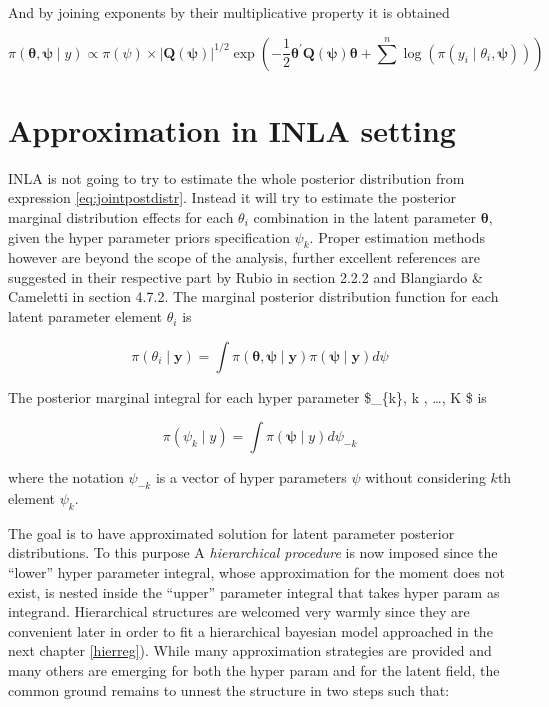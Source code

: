 \documentclass[
  12pt,
  a4paper,
  oneside]{book}
\theoremstyle{definition}
\theoremstyle{definition}
\theoremstyle{definition}
\theoremstyle{remark}
\begin{document}
And by joining exponents by their multiplicative property it is obtained

\begin{equation}
\pi(\boldsymbol{\theta}, \boldsymbol{\psi} \mid y) \propto \pi(\psi) \times|\boldsymbol{Q}(\boldsymbol{\psi})|^{1 / 2} \exp \left(-\frac{1}{2} \boldsymbol{\theta}^{\prime} \boldsymbol{Q}(\boldsymbol{\psi}) \boldsymbol{\theta}+\sum^{n} \log \left(\pi\left(y_{i} \mid \theta_{i}, \boldsymbol{\psi}\right)\right)\right)
\label{eq:jointpostdistr}
\end{equation}

\hypertarget{approx}{%
\section{Approximation in INLA setting}\label{approx}}

INLA is not going to try to estimate the whole posterior distribution from expression \eqref{eq:jointpostdistr}. Instead it will try to estimate the posterior marginal distribution effects for each \(\theta_{i}\) combination in the latent parameter \(\boldsymbol{\theta}\), given the hyper parameter priors specification \(\psi_{k}\). Proper estimation methods however are beyond the scope of the analysis, further excellent references are suggested in their respective part by Rubio \citeyearpar{Bayesian_INLA_Rubio} in section 2.2.2 and Blangiardo \& Cameletti \citeyearpar{Blangiardo-Cameletti} in section 4.7.2.
The marginal posterior distribution function for each latent parameter element \(\theta_{i}\) is

\begin{equation}
  \pi(\theta_{i} \mid \boldsymbol{y})=\int \pi(\boldsymbol{\theta}, \boldsymbol{\psi} \mid \mathbf{y}) \pi(\boldsymbol{\psi} \mid \mathbf{y}) d \psi
\label{eq:latentparam}
\end{equation}

The posterior marginal integral for each hyper parameter \$\psi\_\{k\}, \forall k , \ldots, K \$ is

\[
\pi\left(\psi_{k} \mid y\right)=\int \pi(\boldsymbol{\psi} \mid y) d \psi_{-k}
\]

where the notation \(\psi_{-k}\) is a vector of hyper parameters \(\psi\) without considering \(k\)th element \(\psi_{k}\).

The goal is to have approximated solution for latent parameter posterior distributions. To this purpose A \emph{hierarchical procedure} is now imposed since the ``lower'' hyper parameter integral, whose approximation for the moment does not exist, is nested inside the ``upper'' parameter integral that takes hyper param as integrand. Hierarchical structures are welcomed very warmly since they are convenient later in order to fit a hierarchical bayesian model approached in the next chapter \ref{hierreg}). While many approximation strategies are provided and many others are emerging for both the hyper param and for the latent field, the common ground remains to unnest the structure in two steps such that:
\end{document}

